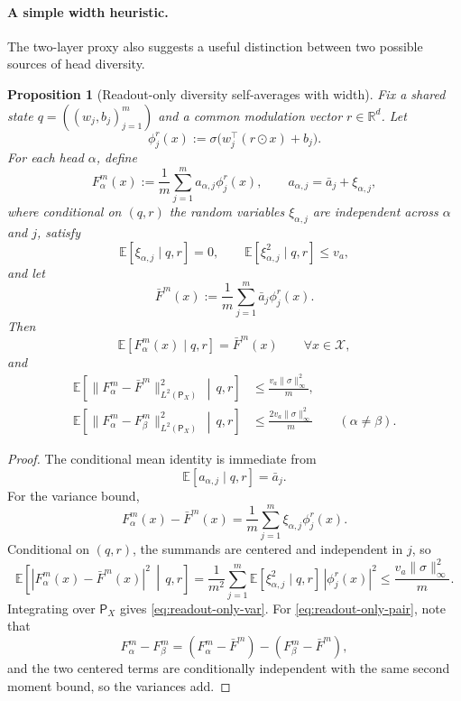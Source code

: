 \documentclass{article}
\newtheorem{proposition}[theorem]{Proposition}
\theoremstyle{definition}
\newcommand{\R}{\mathbb{R}}
\newcommand{\E}{\mathbb{E}}
\begin{document}
\paragraph{A simple width heuristic.}
The two-layer proxy also suggests a useful distinction between two possible
sources of head diversity.

\begin{proposition}[Readout-only diversity self-averages with width]
\label{prop:readout-self-average}
Fix a shared state $q=((w_j,b_j)_{j=1}^m)$ and a common modulation vector
$r\in\R^d$. Let
\[
  \phi_j^r(x):=\sigma\bigl(w_j^\top(r\odot x)+b_j\bigr).
\]
For each head $\alpha$, define
\[
  F_\alpha^m(x)
  :=
  \frac1m\sum_{j=1}^m a_{\alpha,j}\phi_j^r(x),
  \qquad
  a_{\alpha,j}=\bar a_j+\xi_{\alpha,j},
\]
where conditional on $(q,r)$ the random variables $\xi_{\alpha,j}$ are
independent across $\alpha$ and $j$, satisfy
\[
  \E[\xi_{\alpha,j}\mid q,r]=0,
  \qquad
  \E[\xi_{\alpha,j}^2\mid q,r]\le v_a,
\]
and let
\[
  \bar F^m(x)
  :=
  \frac1m\sum_{j=1}^m \bar a_j\phi_j^r(x).
\]
Then
\[
  \E[F_\alpha^m(x)\mid q,r]=\bar F^m(x)
  \qquad
  \forall x\in\mathcal X,
\]
and
\begin{align}
  \E\!\left[
    \|F_\alpha^m-\bar F^m\|_{L^2(\mathsf P_X)}^2
    \,\middle|\, q,r
  \right]
  &\le
  \frac{v_a\|\sigma\|_\infty^2}{m},
  \label{eq:readout-only-var}
  \\
  \E\!\left[
    \|F_\alpha^m-F_\beta^m\|_{L^2(\mathsf P_X)}^2
    \,\middle|\, q,r
  \right]
  &\le
  \frac{2v_a\|\sigma\|_\infty^2}{m}
  \qquad
  (\alpha\neq\beta).
  \label{eq:readout-only-pair}
\end{align}
\end{proposition}

\begin{proof}
The conditional mean identity is immediate from
\[
  \E[a_{\alpha,j}\mid q,r]=\bar a_j.
\]
For the variance bound,
\[
  F_\alpha^m(x)-\bar F^m(x)
  =
  \frac1m\sum_{j=1}^m \xi_{\alpha,j}\phi_j^r(x).
\]
Conditional on $(q,r)$, the summands are centered and independent in $j$, so
\[
  \E\!\left[
    |F_\alpha^m(x)-\bar F^m(x)|^2
    \,\middle|\, q,r
  \right]
  =
  \frac1{m^2}\sum_{j=1}^m
  \E[\xi_{\alpha,j}^2\mid q,r]\,
  |\phi_j^r(x)|^2
  \le
  \frac{v_a\|\sigma\|_\infty^2}{m}.
\]
Integrating over $\mathsf P_X$ gives \eqref{eq:readout-only-var}. For
\eqref{eq:readout-only-pair}, note that
\[
  F_\alpha^m-F_\beta^m
  =
  (F_\alpha^m-\bar F^m)-(F_\beta^m-\bar F^m),
\]
and the two centered terms are conditionally independent with the same second
moment bound, so the variances add.
\end{proof}
\end{document}
